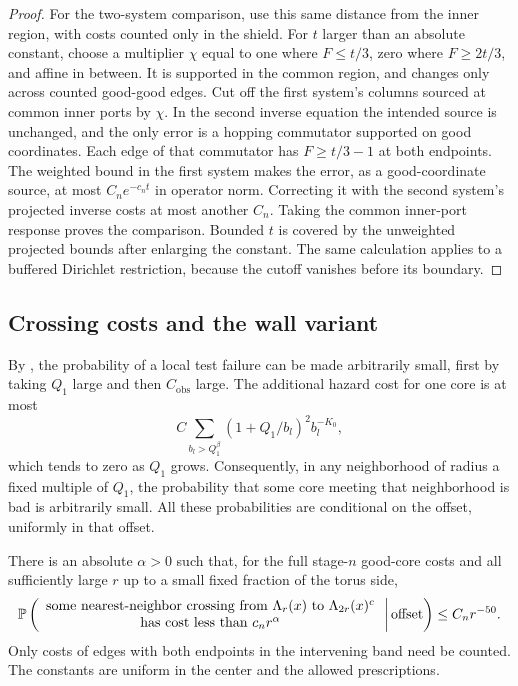 \begin{proof}
For the two-system comparison, use this same distance from the inner
region, with costs counted only in the shield. For $t$ larger than an
absolute constant, choose a multiplier $\chi$ equal to one where
$F\leq t/3$, zero where $F\geq2t/3$, and affine in between.
It is supported in the common region, and changes only across counted
good-good edges. Cut off the first system's columns sourced at common
inner ports by $\chi$. In the second inverse equation the intended
source is unchanged, and the only error is a hopping commutator
supported on good coordinates. Each edge of that commutator has
$F\geq t/3-1$ at both endpoints. The weighted bound in the first
system makes the error, as a good-coordinate source, at most
$C_ne^{-c_nt}$ in operator norm. Correcting it with the second
system's projected inverse costs at most another $C_n$.
Taking the common inner-port response proves the comparison. Bounded
$t$ is covered by the unweighted projected bounds after enlarging the
constant. The same calculation applies to a buffered Dirichlet
restriction, because the cutoff vanishes before its boundary.
\end{proof}

\subsection{Crossing costs and the wall variant}

By , the probability of a
local test failure can be made arbitrarily small, first by taking
$Q_1$ large and then $C_{\mathrm{obs}}$ large. The additional hazard
cost for one core is at most
\[
 C\sum_{b_l>Q_1^\beta}(1+Q_1/b_l)^2b_l^{-K_0},
\]
which tends to zero as $Q_1$ grows. Consequently, in any neighborhood
of radius a fixed multiple of $Q_1$, the probability that some core
meeting that neighborhood is bad is arbitrarily small. All these
probabilities are conditional on the offset, uniformly in that offset.

\begin{proposition}
\label{screen:paths}
There is an absolute $\alpha>0$ such that, for the full stage-$n$
good-core costs and all sufficiently large $r$ up to a small fixed
fraction of the torus side,
\begin{equation}
 \mathbb P\left(\begin{array}{c}
 \text{some nearest-neighbor crossing from }\Lambda_r(x)
       \text{ to }\Lambda_{2r}(x)^c\\
 \text{has cost less than }c_nr^\alpha
 \end{array}\,\middle|\,\text{offset}\right)
 \leq C_nr^{-50}.
 \label{screen:path-bound}
\end{equation}
Only costs of edges with both endpoints in the intervening band need
be counted. The constants are uniform in the center and the allowed
prescriptions.
\end{proposition}

